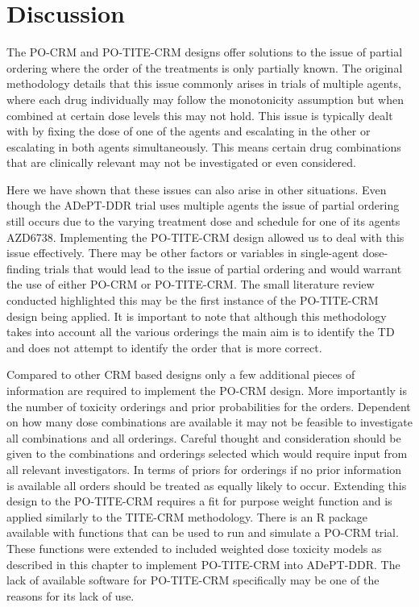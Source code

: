 \section{Discussion}  
\label{adept:Discussion}

The PO-CRM and PO-TITE-CRM designs offer solutions to the issue of partial ordering where the order of the treatments is only partially known. The original methodology details that this issue commonly arises in trials of multiple agents, where each drug individually may follow the monotonicity assumption but when combined at certain dose levels this may not hold. This issue is typically dealt with by fixing the dose of one of the agents and escalating in the other or escalating in both agents simultaneously. This means certain drug combinations that are clinically relevant may not be investigated or even considered.  
 
Here we have shown that these issues can also arise in other situations. Even though the ADePT-DDR trial uses multiple agents the issue of partial ordering still occurs due to the varying treatment dose and schedule for one of its agents AZD6738. Implementing the PO-TITE-CRM design allowed us to deal with this issue effectively. There may be other factors or variables in single-agent dose-finding trials that would lead to the issue of partial ordering and would warrant the use of either PO-CRM or PO-TITE-CRM. The small literature review conducted highlighted this may be the first instance of the PO-TITE-CRM design being applied. It is important to note that although this methodology takes into account all the various orderings the main aim is to identify the TD and does not attempt to identify the order that is more correct. 

Compared to other CRM based designs only a few additional pieces of information are required to implement the PO-CRM design. More importantly is the number of toxicity orderings and prior probabilities for the orders. Dependent on how many dose combinations are available it may not be feasible to investigate all combinations and all orderings. Careful thought and consideration should be given to the combinations and orderings selected which would require input from all relevant investigators. In terms of priors for orderings if no prior information is available all orders should be treated as equally likely to occur. Extending this design to the PO-TITE-CRM requires a fit for purpose weight function and is applied similarly to the TITE-CRM methodology. There is an R package available with functions that can be used to run and simulate a PO-CRM trial. These functions were extended to included weighted dose toxicity models as described in this chapter to implement PO-TITE-CRM into ADePT-DDR. The lack of available software for PO-TITE-CRM specifically may be one of the reasons for its lack of use.

